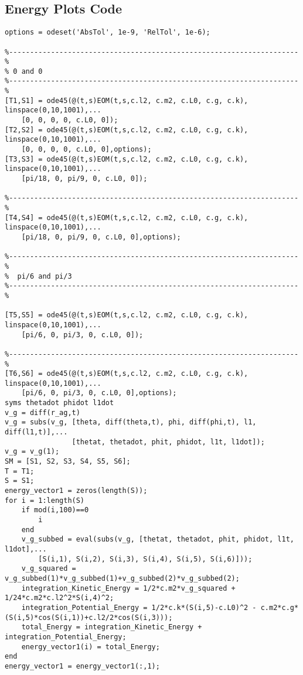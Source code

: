 \subsection{Energy Plots Code}
\begin{lstlisting}[frame=lines,style=Matlab-editor,basicstyle = \mlttfamily]
options = odeset('AbsTol', 1e-9, 'RelTol', 1e-6);

%---------------------------------------------------------------------%
% 0 and 0
%---------------------------------------------------------------------%
[T1,S1] = ode45(@(t,s)EOM(t,s,c.l2, c.m2, c.L0, c.g, c.k), linspace(0,10,1001),...
    [0, 0, 0, 0, c.L0, 0]);
[T2,S2] = ode45(@(t,s)EOM(t,s,c.l2, c.m2, c.L0, c.g, c.k), linspace(0,10,1001),...
    [0, 0, 0, 0, c.L0, 0],options);
[T3,S3] = ode45(@(t,s)EOM(t,s,c.l2, c.m2, c.L0, c.g, c.k), linspace(0,10,1001),...
    [pi/18, 0, pi/9, 0, c.L0, 0]);

%---------------------------------------------------------------------%
[T4,S4] = ode45(@(t,s)EOM(t,s,c.l2, c.m2, c.L0, c.g, c.k), linspace(0,10,1001),...
    [pi/18, 0, pi/9, 0, c.L0, 0],options);

%---------------------------------------------------------------------%
%  pi/6 and pi/3
%---------------------------------------------------------------------%

[T5,S5] = ode45(@(t,s)EOM(t,s,c.l2, c.m2, c.L0, c.g, c.k), linspace(0,10,1001),...
    [pi/6, 0, pi/3, 0, c.L0, 0]);

%---------------------------------------------------------------------%
[T6,S6] = ode45(@(t,s)EOM(t,s,c.l2, c.m2, c.L0, c.g, c.k), linspace(0,10,1001),...
    [pi/6, 0, pi/3, 0, c.L0, 0],options);
syms thetadot phidot l1dot
v_g = diff(r_ag,t)
v_g = subs(v_g, [theta, diff(theta,t), phi, diff(phi,t), l1, diff(l1,t)],...
                [thetat, thetadot, phit, phidot, l1t, l1dot]);
v_g = v_g(1);
SM = [S1, S2, S3, S4, S5, S6];
T = T1;
S = S1;
energy_vector1 = zeros(length(S));
for i = 1:length(S)
    if mod(i,100)==0
        i
    end
    v_g_subbed = eval(subs(v_g, [thetat, thetadot, phit, phidot, l1t, l1dot],...
        [S(i,1), S(i,2), S(i,3), S(i,4), S(i,5), S(i,6)]));
    v_g_squared = v_g_subbed(1)*v_g_subbed(1)+v_g_subbed(2)*v_g_subbed(2);
    integration_Kinetic_Energy = 1/2*c.m2*v_g_squared + 1/24*c.m2*c.l2^2*S(i,4)^2;
    integration_Potential_Energy = 1/2*c.k*(S(i,5)-c.L0)^2 - c.m2*c.g*(S(i,5)*cos(S(i,1))+c.l2/2*cos(S(i,3)));
    total_Energy = integration_Kinetic_Energy + integration_Potential_Energy;
    energy_vector1(i) = total_Energy;
end
energy_vector1 = energy_vector1(:,1);


\end{lstlisting}

